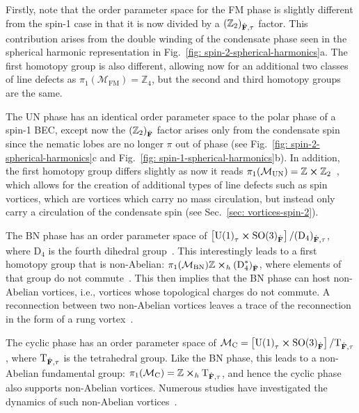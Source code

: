 Firstly, note that the order parameter space for the FM phase is slightly
different from the spin-1 case in that it is now divided by a
\({(\mathbb{Z}_2)}_{\hat{\vb{F}}, \tau}\) factor.
This contribution arises from the double winding of the condensate phase seen in
the spherical harmonic representation in
Fig.~\ref{fig: spin-2-spherical-harmonics}a.
The first homotopy group is also different, allowing now for an additional two
classes of line defects as \(\pi_1(\mathcal{M}_\text{FM}) = \mathbb{Z}_4\), but
the second and third homotopy groups are the same.

The UN phase has an identical order parameter space to the polar phase of a
spin-1 BEC, except now the \({(\mathbb{Z}_2)}_{\hat{\vb{F}}}\) factor arises
only from the condensate spin since the nematic lobes are no longer \(\pi \)
out of phase (see Fig.~\ref{fig: spin-2-spherical-harmonics}c and
Fig.~\ref{fig: spin-1-spherical-harmonics}b).
In addition, the first homotopy group differs slightly as now it reads
\(\pi_1(\mathcal{M}_\text{UN}) = \mathbb{Z} \cross
\mathbb{Z}_2\)~\cite{Kobayashi2012}, which allows for the creation of additional
types of line defects such as spin vortices, which are vortices which carry no
mass circulation, but instead only carry a circulation of the condensate spin
(see Sec.~\ref{sec: vortices-spin-2}).

The BN phase has an order parameter space of \(\left[{\text{U}(1)}_\tau \cross
{\text{SO}(3)}_{\hat{\vb{F}}}\right] / {(\text{D}_4)}_{\hat{\vb{F}}, \tau}\),
where \(\text{D}_4\) is the fourth dihedral group~\cite{Kobayashi2012}.
This interestingly leads to a first homotopy group that is non-Abelian:
\(\pi_1(\mathcal{M}_\text{BN})\mathbb{Z} \cross_h
{(\text{D}^\ast_4)}_{\hat{\vb{F}}}\), where elements of that group do not
commute~\cite{Mermin1979}.
This then implies that the BN phase can host non-Abelian vortices, i.e.,
vortices whose topological charges do not commute.
A reconnection between two non-Abelian vortices leaves a trace of the
reconnection in the form of a rung vortex~\cite{Mermin1979}.

The cyclic phase has an order parameter space of \(\mathcal{M}_\text{C} =
\left[{\text{U}(1)}_\tau \cross {\text{SO}(3)}_{\hat{\vb{F}}}\right]
/ \text{T}_{\hat{\vb{F}}, \tau}\), where \(\text{T}_{\hat{\vb{F}}, \tau}\) is
the tetrahedral group.
Like the BN phase, this leads to a non-Abelian fundamental group:
\(\pi_1(\mathcal{M}_\text{C}) = \mathbb{Z} \cross_h
\text{T}_{\hat{\vb{F}}, \tau}\), and hence the cyclic phase also supports
non-Abelian vortices.
Numerous studies have investigated the dynamics of such non-Abelian
vortices~\cite{Mawson2015, Borgh2016}.

